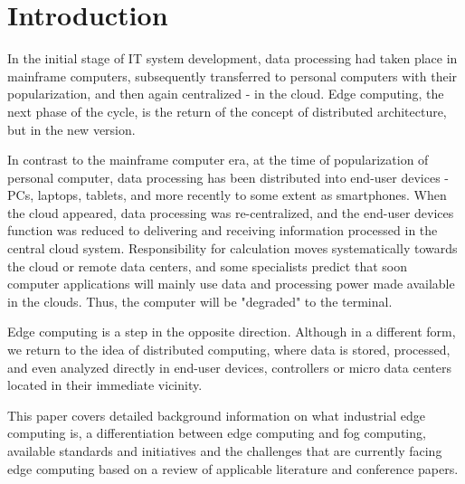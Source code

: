 \section{Introduction}\label{sec:introduction}
In the initial stage of IT system development, data processing had taken place in mainframe computers, subsequently transferred to personal computers with their popularization, and then again centralized - in the cloud. Edge computing, the next phase of the cycle, is the return of the concept of distributed architecture, but in the new version.\par
In contrast to the mainframe computer era, at the time of popularization of personal computer, data processing has been distributed into end-user devices - PCs, laptops, tablets, and more recently to some extent as smartphones. When the cloud appeared, data processing was re-centralized, and the end-user devices function was reduced to delivering and receiving information processed in the central cloud system. Responsibility for calculation moves systematically towards the cloud or remote data centers, and some specialists predict that soon computer applications will mainly use data and processing power made available in the clouds. Thus, the computer will be "degraded" to the terminal.\par
Edge computing is a step in the opposite direction. Although in a different form, we return to the idea of distributed computing, where data is stored, processed, and even analyzed directly in end-user devices, controllers or micro data centers located in their immediate vicinity.\par
This paper covers detailed background information on what industrial edge computing is, a differentiation between edge computing and fog computing, available standards and initiatives and the challenges that are currently facing edge computing based on a review of applicable literature and conference papers.\par
